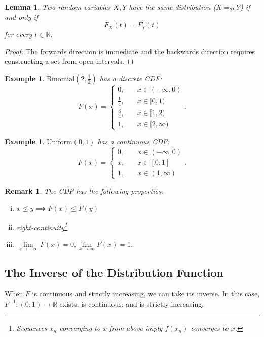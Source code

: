 \documentclass{tufte-handout}
\newcommand*\R{\mathbb{R}}
\newtheorem{lemma}[thm]{Lemma}
\newtheorem{rmk}[thm]{Remark}
\newtheorem{ex}[thm]{Example}
\theoremstyle{definition}
\begin{document}
\begin{lemma}
	Two random variables $X,Y$ have the same distribution ($X =_{\mathscr{D}} Y$) if and only if \[
		F_X(t) = F_Y(t)
	\] for every $t \in \R$.
\end{lemma}

\begin{proof}
	The forwards direction is immediate and the backwards direction requires constructing a set from open intervals.
\end{proof}

\begin{ex}
	$\text{Binomial}(2, \frac{1}{2})$ has a discrete CDF: \[
		F(x) = \begin{cases}
			0, \quad &x \in (-\infty,0) \\
			\frac{1}{4}, \quad &x \in [0, 1) \\
			\frac{3}{4}, \quad &x \in [1,2) \\
			1, \quad &x \in [2,\infty)
		\end{cases}
	.\] 
\end{ex}

\begin{ex}
	$\text{Uniform}(0,1)$ has a continuous CDF:
	\[
		F(x) = \begin{cases}
			0, \quad &x \in (-\infty,0) \\
			x, \quad &x \in [0,1] \\
			1, \quad &x \in (1,\infty)
		\end{cases}
	.\] 
\end{ex}

\begin{rmk}
	The CDF has the following properties:
	\begin{enumerate}[(i)]
		\item $x \le y \implies F(x) \le F(y)$ 
		\item right-continuity\footnote{Sequences $x_n$ converging to $x$ from above imply $f(x_n)$ converges to $x$.}
		\item $\lim\limits_{x \to -\infty} F(x) = 0, \lim\limits_{x \to \infty} F(x) = 1.$
	\end{enumerate}
\end{rmk}

\subsection{The Inverse of the Distribution Function}

When $F$ is continuous and strictly increasing, we can take its inverse. In this case, $F^{-1}: (0,1) \to \R$ exists, is continuous, and is strictly increasing.
\end{document}
